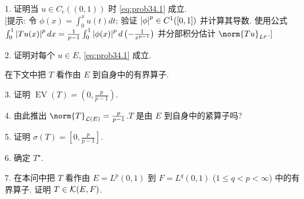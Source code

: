 \begin{problem}[第 4, 6 章]
1. 证明当 $u\in C_c((0,1))$ 时 \eqref{eq:prob34.1} 成立.\\
{[提示: 令 $\phi(x)=\int_0^xu(t)dt$; 验证 $\left|\phi\right|^p\in C^1([0,1])$ 并计算其导数.
使用公式 $\int_0^1\left|Tu(x)\right|^pdx=\frac{1}{p-1}\int_0^1\left|\phi(x)\right|^pd\left(-\frac{1}{x^{p-1}}\right)$
并分部积分估计 $\norm{Tu}_{L^p}$.]}

2. 证明对每个 $u\in E$, \eqref{eq:prob34.1} 成立.

在下文中把 $T$ 看作由 $E$ 到自身中的有界算子.

3. 证明 $\operatorname{EV}(T)=\left(0,\frac{p}{p-1}\right)$.

4. 由此推出 $\norm{T}_{\LL(E)}=\frac{p}{p-1}$.$T$ 是由 $E$ 到自身中的紧算子吗?

5. 证明 $\sigma(T)=\left[0,\frac{p}{p-1}\right]$.

6. 确定 $T^\star$.

7. 在本问中把 $T$ 看作由 $E=L^p(0,1)$ 到 $F=L^q(0,1)$ ($1\le q<p<\infty$) 中的有界算子.
证明 $T\in\mathcal{K}(E,F)$.
\end{problem}

